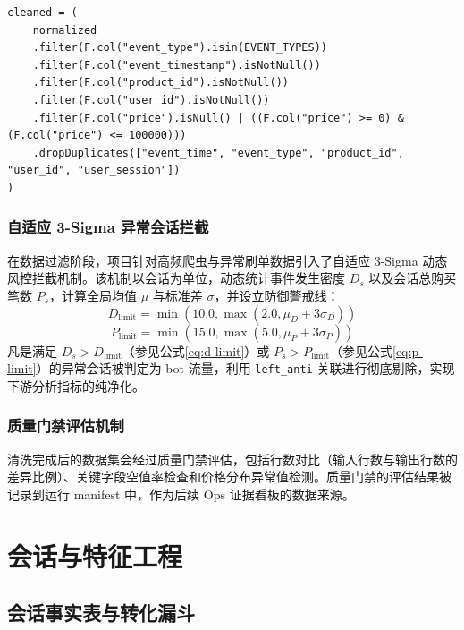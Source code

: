 \begin{lstlisting}[style=codexcode]
cleaned = (
    normalized
    .filter(F.col("event_type").isin(EVENT_TYPES))
    .filter(F.col("event_timestamp").isNotNull())
    .filter(F.col("product_id").isNotNull())
    .filter(F.col("user_id").isNotNull())
    .filter(F.col("price").isNull() | ((F.col("price") >= 0) & (F.col("price") <= 100000)))
    .dropDuplicates(["event_time", "event_type", "product_id", "user_id", "user_session"])
)
\end{lstlisting}

\subsubsection{自适应 3-Sigma 异常会话拦截}

在数据过滤阶段，项目针对高频爬虫与异常刷单数据引入了自适应 3-Sigma 动态风控拦截机制。该机制以会话为单位，动态统计事件发生密度 $D_s$ 以及会话总购买笔数 $P_s$，计算全局均值 $\mu$ 与标准差 $\sigma$，并设立防御警戒线：
\begin{equation}
    D_{\text{limit}} = \min(10.0, \max(2.0, \mu_D + 3\sigma_D))
    \label{eq:d-limit}
\end{equation}
\begin{equation}
    P_{\text{limit}} = \min(15.0, \max(5.0, \mu_P + 3\sigma_P))
    \label{eq:p-limit}
\end{equation}
凡是满足 $D_s > D_{\text{limit}}$（参见公式\eqref{eq:d-limit}）或 $P_s > P_{\text{limit}}$（参见公式\eqref{eq:p-limit}）的异常会话被判定为 bot 流量，利用 \texttt{left\_anti} 关联进行彻底剔除，实现下游分析指标的纯净化。

\subsubsection{质量门禁评估机制}

清洗完成后的数据集会经过质量门禁评估，包括行数对比（输入行数与输出行数的差异比例）、关键字段空值率检查和价格分布异常值检测。质量门禁的评估结果被记录到运行 manifest 中，作为后续 Ops 证据看板的数据来源。

\section{会话与特征工程}

\subsection{会话事实表与转化漏斗}

